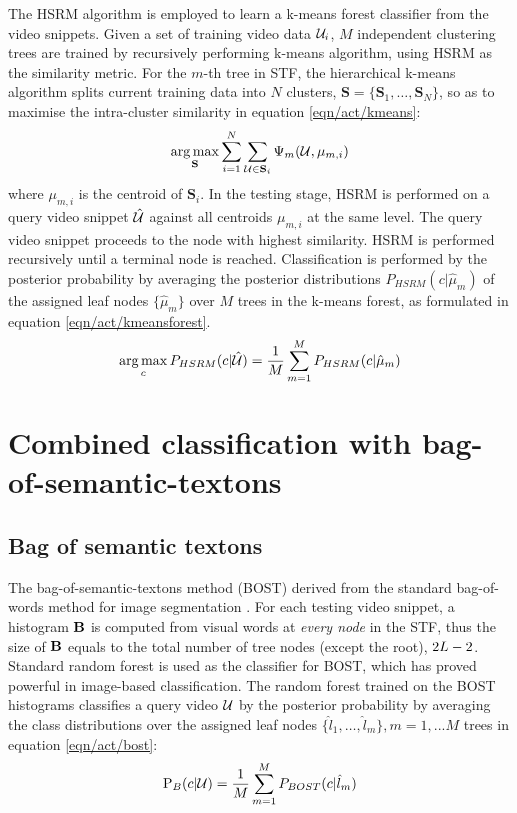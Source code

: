 The HSRM algorithm is employed to learn a k-means forest classifier from the video snippets. Given a set of training video data $\mathcal{U}_i$, $M$ independent clustering trees are trained by recursively performing k-means algorithm, using HSRM as the similarity metric. 
For the $m$-th tree in STF, the hierarchical k-means algorithm splits current training data into $N$ clusters, $\mathbf{S} = \{\mathbf{S}_1,\dots,\mathbf{S}_N\}$, so as to maximise the intra-cluster similarity in equation \ref{eqn/act/kmeans}:
\begin{equation}
	\displaystyle\operatorname*{arg\,max}_{\mathbf{S}} \displaystyle\sum_{i = 1}^{N}\sum_{\mathcal{U} \in \mathbf{S}_{i}} \Psi_m(\mathcal{U}, \mu_{m,i})
	\label{eqn/act/kmeans}
\end{equation}
where $\mu_{m,i}$ is the centroid of $\mathbf{S}_i$. In the testing stage, HSRM is performed on a query video snippet $\mathcal{\hat{U}}$ against all centroids $\mu_{m,i}$ at the same level. The query video snippet proceeds to the node with highest similarity. HSRM is performed recursively until a terminal node is reached. Classification is performed by the posterior probability by averaging the posterior distributions $P_{HSRM}(c|\hat{\mu}_{m})$ of the assigned leaf nodes $\{ \hat{\mu}_m \}$ over $M$ trees in the k-means forest, as formulated in equation \ref{eqn/act/kmeansforest}. 
\begin{equation}
	\displaystyle\operatorname*{arg\,max}_{c}P_{HSRM}(c|\mathcal{\hat{U}}) = \frac{1}{M}\displaystyle\sum_{m=1}^{M}P_{HSRM}(c|\hat{\mu}_{m})
	\label{eqn/act/kmeansforest}
\end{equation}

\section{Combined classification with bag-of-semantic-textons}
\label{sec/act/combine}

\subsection{Bag of semantic textons}
The bag-of-semantic-textons method (BOST) derived from the standard bag-of-words method for image segmentation \cite{Shotton2008}. For each testing video snippet, a histogram $\mathbf{B}$ is computed from visual words at \emph{every node} in the STF, thus the size of $\mathbf{B}$ equals to the total number of tree nodes (except the root), \ie $2L - 2$.  
Standard random forest \cite{Breiman2001} is used as the classifier for BOST, which has proved powerful in image-based classification. 
The random forest trained on the BOST histograms classifies a query video $\mathcal{U}$ by the posterior probability by averaging the class distributions over the assigned leaf nodes $\{\hat{l}_1,\dots,\hat{l}_{m}\}, m=1,...M$ trees in equation \ref{eqn/act/bost}:
\begin{equation}
\mathrm{P}_{B}(c|\mathcal{U}) = \frac{1}{M}\displaystyle\sum_{m=1}^{M}P_{BOST}(c|\hat{l}_m)
\label{eqn/act/bost}
\end{equation}

